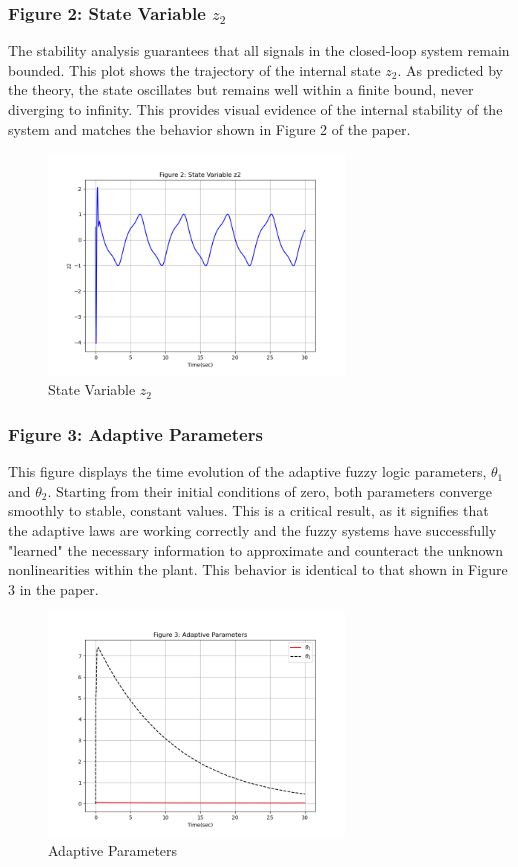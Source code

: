 \subsubsection{Figure 2: State Variable $z_2$} 
The stability analysis guarantees that all signals in the closed-loop system remain bounded. This plot shows the trajectory of the internal state $z_2$. As predicted by the theory, the state oscillates but remains well within a finite bound, never diverging to infinity. This provides visual evidence of the internal stability of the system and matches the behavior shown in Figure 2 of the paper.
\begin{figure}
	\centering
	\includegraphics[width=0.7\textwidth]{images/sim2.png}
	\caption{State Variable $z_2$}
	\label{fig:fig42}
\end{figure}

\clearpage
\subsubsection{Figure 3: Adaptive Parameters}
 This figure displays the time evolution of the adaptive fuzzy logic parameters, $\theta_1$ and $\theta_2$. Starting from their initial conditions of zero, both parameters converge smoothly to stable, constant values. This is a critical result, as it signifies that the adaptive laws are working correctly and the fuzzy systems have successfully "learned" the necessary information to approximate and counteract the unknown nonlinearities within the plant. This behavior is identical to that shown in Figure 3 in the paper.
\begin{figure}
	\centering
	\includegraphics[width=0.7\textwidth]{images/sim3.png}
	\caption{Adaptive Parameters}
	\label{fig:fig43}
\end{figure}


